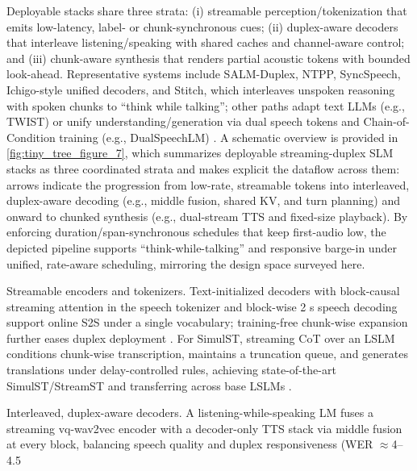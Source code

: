 \documentclass{article}
\begin{document}
Deployable stacks share three strata: (i) streamable perception/tokenization that emits low-latency, label- or chunk-synchronous cues; (ii) duplex-aware decoders that interleave listening/speaking with shared caches and channel-aware control; and (iii) chunk-aware synthesis that renders partial acoustic tokens with bounded look-ahead. Representative systems include SALM-Duplex, NTPP, SyncSpeech, Ichigo-style unified decoders, and Stitch, which interleaves unspoken reasoning with spoken chunks to ``think while talking''; other paths adapt text LLMs (e.g., TWIST) or unify understanding/generation via dual speech tokens and Chain-of-Condition training (e.g., DualSpeechLM) \cite{chiang2025stitchsimultaneousthinkingtalkingchunked,hassid2024textuallypretrainedspeechlanguagemodels,wang2025dualspeechlmtowardsunifiedspeechundersta}. A schematic overview is provided in \autoref{fig:tiny_tree_figure_7}, which summarizes deployable streaming-duplex SLM stacks as three coordinated strata and makes explicit the dataflow across them: arrows indicate the progression from low-rate, streamable tokens into interleaved, duplex-aware decoding (e.g., middle fusion, shared KV, and turn planning) and onward to chunked synthesis (e.g., dual-stream TTS and fixed-size playback). By enforcing duration/span-synchronous schedules that keep first-audio low, the depicted pipeline supports ``think-while-talking'' and responsive barge-in under unified, rate-aware scheduling, mirroring the design space surveyed here.

Streamable encoders and tokenizers. Text-initialized decoders with block-causal streaming attention in the speech tokenizer and block-wise 2 s speech decoding support online S2S under a single vocabulary; training-free chunk-wise expansion further eases duplex deployment \cite{zeng2024scalingspeechtextpretrainingsyntheticint,chang2024dcspinspeakerinvariantspeechtokenizerspo}. For SimulST, streaming CoT over an LSLM conditions chunk-wise transcription, maintains a truncation queue, and generates translations under delay-controlled rules, achieving state-of-the-art SimulST/StreamST and transferring across base LSLMs \cite{guo2025streamuniachievingstreamingspeechtransla}.

Interleaved, duplex-aware decoders. A listening-while-speaking LM fuses a streaming vq-wav2vec encoder with a decoder-only TTS stack via middle fusion at every block, balancing speech quality and duplex responsiveness (WER $\approx$4--4.5%
\end{document}
